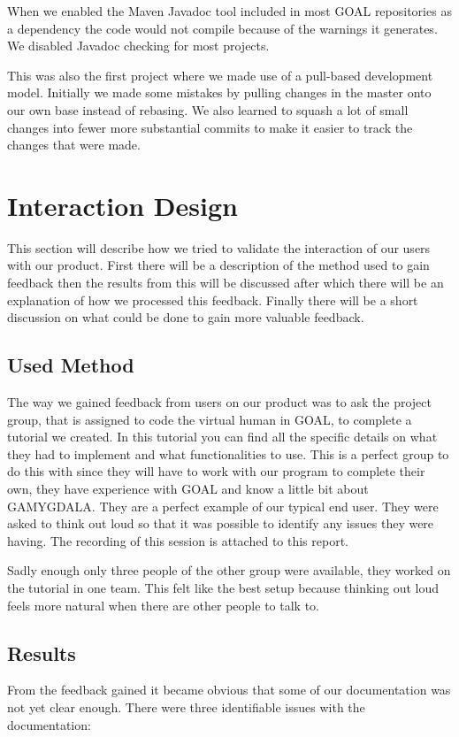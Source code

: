 \documentclass[11pt]{article}
\begin{document}
When we enabled the Maven Javadoc tool included in most GOAL repositories as a dependency the code would not compile because of the warnings it generates. We disabled Javadoc checking for most projects.\par
This was also the first project where we made use of a pull-based development model. Initially we made some mistakes by pulling changes in the master onto our own base instead of rebasing. We also learned to squash a lot of small changes into fewer more substantial commits to make it easier to track the changes that were made. 
\clearpage

\section{Interaction Design}
This section will describe how we tried to validate the interaction of our users with our product. First there will be a description of the method used to gain feedback then the results from this will be discussed after which there will be an explanation of how we processed this feedback. Finally there will be a short discussion on what could be done to gain more valuable feedback.

\subsection{Used Method}
The way we gained feedback from users on our product was to ask the project group, that is assigned to code the virtual human in GOAL, to complete a tutorial\cite{tutorial} we created. In this tutorial you can find all the specific details on what they had to implement and what functionalities to use. This is a perfect group to do this with since they will have to work with our program to complete their own, they have experience with GOAL and know a little bit about GAMYGDALA. They are a perfect example of our typical end user. They were asked to think out loud so that it was possible to identify any issues they were having. The recording of this session is attached to this report.

Sadly enough only three people of the other group were available, they worked on the tutorial in one team. This felt like the best setup because thinking out loud feels more natural when there are other people to talk to.

\subsection{Results}
From the feedback gained it became obvious that some of our documentation was not yet clear enough. There were three identifiable issues with the documentation:
\end{document}
